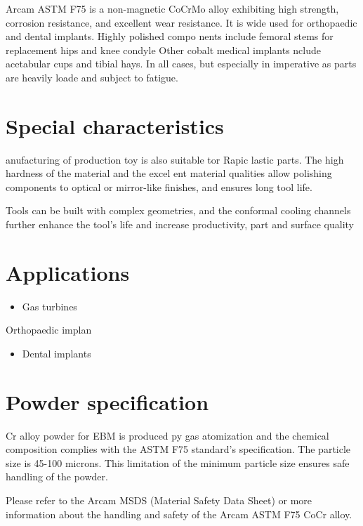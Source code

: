 \documentclass[10pt]{article}
\begin{document}
Arcam ASTM F75 is a non-magnetic CoCrMo alloy exhibiting high strength, corrosion resistance, and excellent wear resistance. It is wide used for orthopaedic and dental implants. Highly polished compo nents include femoral stems for replacement hips and knee condyle Other cobalt medical implants nclude acetabular cups and tibial hays. In all cases, but especially in imperative as parts are heavily loade and subject to fatigue.

\section*{Special characteristics}
anufacturing of production toy is also suitable tor Rapic lastic parts. The high hardness of the material and the excel ent material qualities allow polishing components to optical or mirror-like finishes, and ensures long tool life.

Tools can be built with complex geometries, and the conformal cooling channels further enhance the tool's life and increase productivity, part and surface quality

\section*{Applications}
\begin{itemize}
  \item Gas turbines
\end{itemize}

Orthopaedic implan

\begin{itemize}
  \item Dental implants
\end{itemize}

\section*{Powder specification}
Cr alloy powder for EBM is produced py gas atomization and the chemical composition complies with the ASTM F75 standard's specification. The particle size is 45-100 microns. This limitation of the minimum particle size ensures safe handling of the powder.

Please refer to the Arcam MSDS (Material Safety Data Sheet) or more information about the handling and safety of the Arcam ASTM F75 CoCr alloy.
\end{document}
